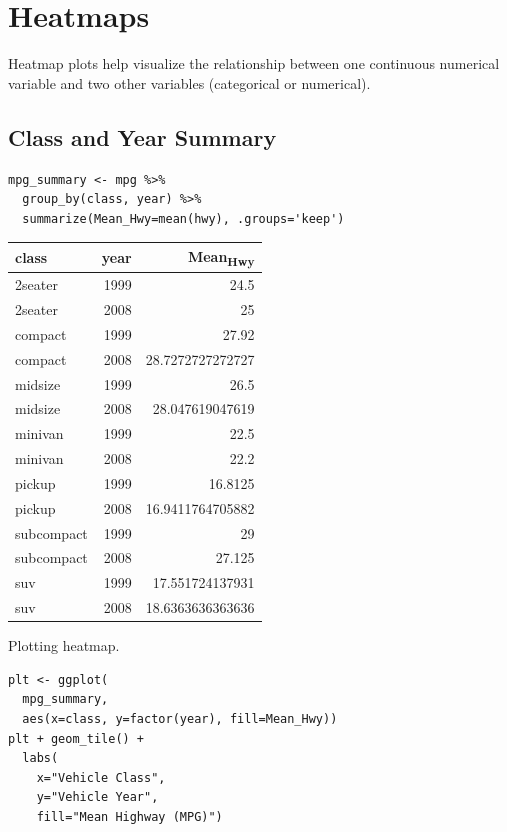 \documentclass[11pt]{article}
\begin{document}
\section{Heatmaps}
\label{sec:orgc2dc5b6}

Heatmap plots help visualize the relationship between one continuous numerical variable and two other variables (categorical or numerical).

\subsection{Class and Year Summary}
\label{sec:org9b2eee7}

\begin{verbatim}
mpg_summary <- mpg %>%
  group_by(class, year) %>%
  summarize(Mean_Hwy=mean(hwy), .groups='keep')
\end{verbatim}

\begin{org}
\begin{center}
\begin{tabular}{lrr}
class & year & Mean\textsubscript{Hwy}\\
\hline
2seater & 1999 & 24.5\\
2seater & 2008 & 25\\
compact & 1999 & 27.92\\
compact & 2008 & 28.7272727272727\\
midsize & 1999 & 26.5\\
midsize & 2008 & 28.047619047619\\
minivan & 1999 & 22.5\\
minivan & 2008 & 22.2\\
pickup & 1999 & 16.8125\\
pickup & 2008 & 16.9411764705882\\
subcompact & 1999 & 29\\
subcompact & 2008 & 27.125\\
suv & 1999 & 17.551724137931\\
suv & 2008 & 18.6363636363636\\
\end{tabular}
\end{center}
\end{org}

Plotting heatmap.

\begin{verbatim}
plt <- ggplot(
  mpg_summary,
  aes(x=class, y=factor(year), fill=Mean_Hwy))
plt + geom_tile() +
  labs(
    x="Vehicle Class",
    y="Vehicle Year",
    fill="Mean Highway (MPG)")
\end{verbatim}
\end{document}
